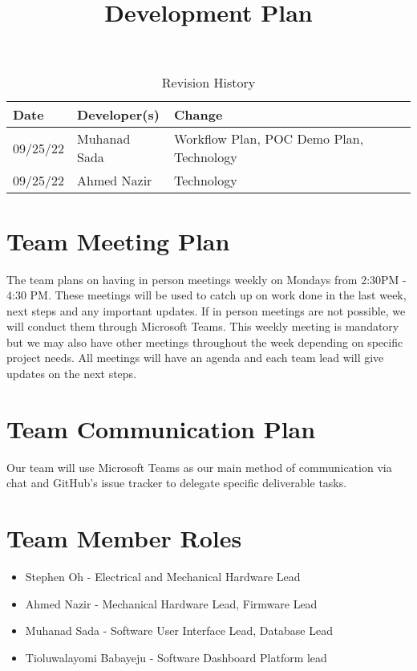 \documentclass{article}
\title{Development Plan\\\progname}
\author{\authname}
\date{}
\begin{document}
\begin{table}[hp]
\caption{Revision History} \label{TblRevisionHistory}
\begin{tabularx}{\textwidth}{llX}
\toprule
\textbf{Date} & \textbf{Developer(s)} & \textbf{Change}\\
\midrule
09/25/22 & Muhanad Sada & Workflow Plan, POC Demo Plan, Technology\\
09/25/22 & Ahmed Nazir & Technology\\
\bottomrule
\end{tabularx}
\end{table}

\newpage

\maketitle


\section{Team Meeting Plan}
The team plans on having in person meetings weekly on Mondays from 2:30PM - 4:30 PM. These meetings will be used to catch up on work done in the last week, next steps and any important updates. If in person meetings are not possible, we will conduct them through Microsoft Teams. This weekly meeting is mandatory but we may also have other meetings throughout the week depending on specific project needs. All meetings will have an agenda and each team lead will give updates on the next steps. 

\section{Team Communication Plan}
Our team will use Microsoft Teams as our main method of communication via chat and GitHub's issue tracker to delegate specific deliverable tasks.

\section{Team Member Roles}
\begin{itemize}
	\item Stephen Oh - Electrical and Mechanical Hardware Lead
	\item Ahmed Nazir - Mechanical Hardware Lead, Firmware Lead
	\item Muhanad Sada - Software User Interface Lead, Database Lead
	\item Tioluwalayomi Babayeju - Software Dashboard Platform lead
\end{itemize}
\end{document}
